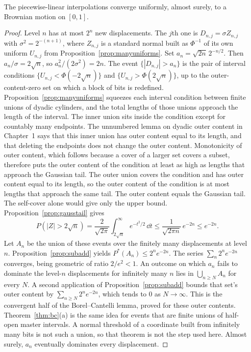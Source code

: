 \begin{theorem}[existence]\label{thm:levy}
The piecewise-linear interpolations converge uniformly, almost surely, to a Brownian motion on $[0,1]$.
\end{theorem}
\begin{proof}
Level $n$ has at most $2^n$ new displacements. The $j$th one is $D_{n,j}=\sigma Z_{n,j}$ with $\sigma^2=2^{-(n+1)}$, where $Z_{n,j}$ is a standard normal built as $\Phi^{-1}$ of its own uniform $U_{n,j}$ from Proposition~\ref{prop:manyuniforms}. Set $a_n=\sqrt{2n}\,2^{-n/2}$. Then $a_n/\sigma=2\sqrt n$, so $a_n^2/(2\sigma^2)=2n$. The event $\{|D_{n,j}|>a_n\}$ is the pair of interval conditions $\{U_{n,j}<\Phi(-2\sqrt n)\}$ and $\{U_{n,j}>\Phi(2\sqrt n)\}$, up to the outer-content-zero set on which a block of bits is redefined. Proposition~\ref{prop:manyuniforms} squeezes each interval condition between finite unions of dyadic cylinders, and the total lengths of those unions approach the length of the interval. The inner union sits inside the condition except for countably many endpoints. The unnumbered lemma on dyadic outer content in Chapter~1 says that this inner union has outer content equal to its length, and that deleting the endpoints does not change the outer content. Monotonicity of outer content, which follows because a cover of a larger set covers a subset, therefore puts the outer content of the condition at least as high as lengths that approach the Gaussian tail. The outer union covers the condition and has outer content equal to its length, so the outer content of the condition is at most lengths that approach the same tail. The outer content equals the Gaussian tail. The self-cover alone would give only the upper bound. Proposition~\ref{prop:gausstail} gives
\[
 P(|Z|>2\sqrt n)
 =\frac{2}{\sqrt{2\pi}}\int_{2\sqrt n}^{\infty}e^{-t^2/2}\,\dd t
 \le\frac{1}{\sqrt{2\pi n}}\,e^{-2n}
 \le e^{-2n}.
\]
Let $A_n$ be the union of these events over the finitely many displacements at level $n$. Proposition~\ref{prop:subadd} yields $P^*(A_n)\le 2^n e^{-2n}$. The series $\sum_n 2^n e^{-2n}$ converges, being geometric of ratio $2/e^2<1$. An outcome on which $a_n$ fails to dominate the level-$n$ displacements for infinitely many $n$ lies in $\bigcup_{n\ge N}A_n$ for every $N$. A second application of Proposition~\ref{prop:subadd} bounds that set's outer content by $\sum_{n\ge N}2^n e^{-2n}$, which tends to $0$ as $N\to\infty$. This is the convergent half of the Borel--Cantelli lemma, proved for these outer contents. Theorem~\ref{thm:bc}(a) is the same idea for events that are finite unions of half-open master intervals. A normal threshold of a coordinate built from infinitely many bits is not such a union, so that theorem is not the step used here. Almost surely, $a_n$ eventually dominates every displacement.


\end{proof}

